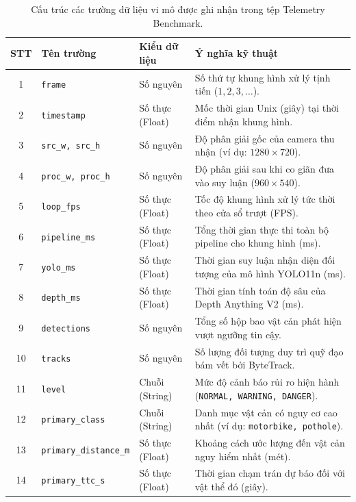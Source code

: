 \begin{table}[htbp]
\centering
\caption{Cấu trúc các trường dữ liệu vi mô được ghi nhận trong tệp Telemetry Benchmark.}
\label{tab:benchmark_csv_schema}
\small
\begin{tabular}{|c|l|l|p{6.8cm}|}
\hline
\textbf{STT} & \textbf{Tên trường} & \textbf{Kiểu dữ liệu} & \textbf{Ý nghĩa kỹ thuật} \\ \hline
1 & \texttt{frame} & Số nguyên & Số thứ tự khung hình xử lý tịnh tiến ($1, 2, 3, \dots$). \\ \hline
2 & \texttt{timestamp} & Số thực (Float) & Mốc thời gian Unix (giây) tại thời điểm nhận khung hình. \\ \hline
3 & \texttt{src\_w, src\_h} & Số nguyên & Độ phân giải gốc của camera thu nhận (ví dụ: $1280 \times 720$). \\ \hline
4 & \texttt{proc\_w, proc\_h} & Số nguyên & Độ phân giải sau khi co giãn đưa vào suy luận ($960 \times 540$). \\ \hline
5 & \texttt{loop\_fps} & Số thực (Float) & Tốc độ khung hình xử lý tức thời theo cửa sổ trượt (FPS). \\ \hline
6 & \texttt{pipeline\_ms} & Số thực (Float) & Tổng thời gian thực thi toàn bộ pipeline cho khung hình (ms). \\ \hline
7 & \texttt{yolo\_ms} & Số thực (Float) & Thời gian suy luận nhận diện đối tượng của mô hình YOLO11n (ms). \\ \hline
8 & \texttt{depth\_ms} & Số thực (Float) & Thời gian tính toán độ sâu của Depth Anything V2 (ms). \\ \hline
9 & \texttt{detections} & Số nguyên & Tổng số hộp bao vật cản phát hiện vượt ngưỡng tin cậy. \\ \hline
10 & \texttt{tracks} & Số nguyên & Số lượng đối tượng duy trì quỹ đạo bám vết bởi ByteTrack. \\ \hline
11 & \texttt{level} & Chuỗi (String) & Mức độ cảnh báo rủi ro hiện hành (\texttt{NORMAL, WARNING, DANGER}). \\ \hline
12 & \texttt{primary\_class} & Chuỗi (String) & Danh mục vật cản có nguy cơ cao nhất (ví dụ: \texttt{motorbike, pothole}). \\ \hline
13 & \texttt{primary\_distance\_m} & Số thực (Float) & Khoảng cách ước lượng đến vật cản nguy hiểm nhất (mét). \\ \hline
14 & \texttt{primary\_ttc\_s} & Số thực (Float) & Thời gian chạm trán dự báo đối với vật thể đó (giây). \\ \hline
\end{tabular}
\end{table}

